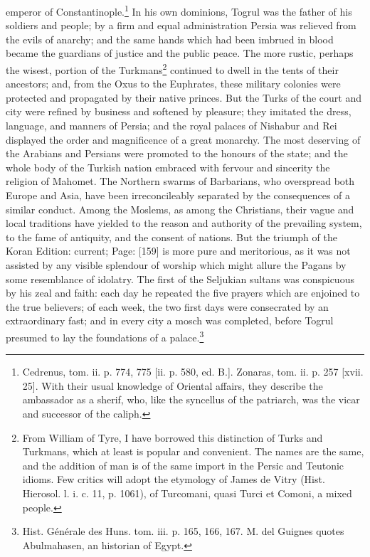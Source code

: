 emperor of Constantinople.\footnote{Cedrenus, tom. ii. p. 774, 775 [ii. p. 580, ed. B.]. Zonaras, tom. ii. p. 257 [xvii. 25]. With their usual knowledge of Oriental affairs, they describe the ambassador as a sherif, who, like the syncellus of the patriarch, was the vicar and successor of the caliph.} In his own dominions, Togrul was the father of his soldiers and people; by a firm and equal administration Persia was relieved from the evils of anarchy; and the same hands which had been imbrued in blood became the guardians of justice and the public peace. The more rustic, perhaps the wisest, portion of the Turkmans\footnote{From William of Tyre, I have borrowed this distinction of Turks and Turkmans, which at least is popular and convenient. The names are the same, and the addition of man is of the same import in the Persic and Teutonic idioms. Few critics will adopt the etymology of James de Vitry (Hist. Hierosol. l. i. c. 11, p. 1061), of Turcomani, quasi Turci et Comoni, a mixed people.} continued to dwell in the tents of their ancestors; and, from the Oxus to the Euphrates, these military colonies were protected and propagated by their native princes. But the Turks of the court and city were refined by business and softened by pleasure; they imitated the dress, language, and manners of Persia; and the royal palaces of Nishabur and Rei displayed the order and magnificence of a great monarchy. The most deserving of the Arabians and Persians were promoted to the honours of the state; and the whole body of the Turkish nation embraced with fervour and sincerity the religion of Mahomet. The Northern swarms of Barbarians, who overspread both Europe and Asia, have been irreconcileably separated by the consequences of a similar conduct. Among the Moslems, as among the Christians, their vague and local traditions have yielded to the reason and authority of the prevailing system, to the fame of antiquity, and the consent of nations. But the triumph of the Koran Edition: current; Page: [159] is more pure and meritorious, as it was not assisted by any visible splendour of worship which might allure the Pagans by some resemblance of idolatry. The first of the Seljukian sultans was conspicuous by his zeal and faith: each day he repeated the five prayers which are enjoined to the true believers; of each week, the two first days were consecrated by an extraordinary fast; and in every city a mosch was completed, before Togrul presumed to lay the foundations of a palace.\footnote{Hist. Générale des Huns. tom. iii. p. 165, 166, 167. M. del Guignes quotes Abulmahasen, an historian of Egypt.}

